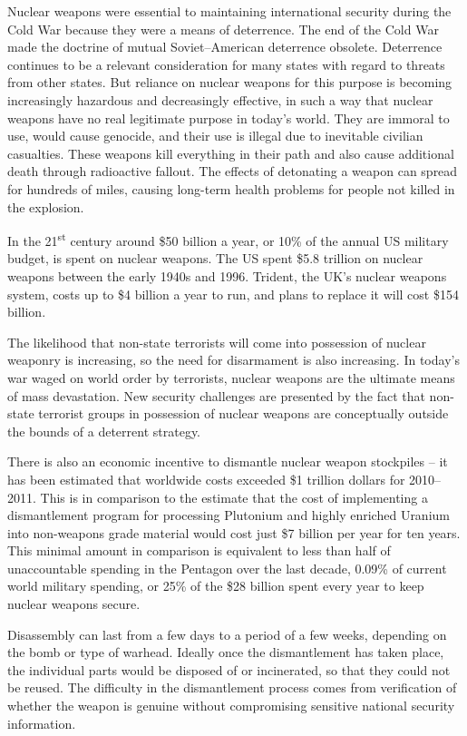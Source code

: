 \documentclass[twoside,titlepage,11pt,twocolumn,a4paper]{article}
\begin{document}
Nuclear weapons were essential to maintaining international security
during the Cold War because they were a means of deterrence. The end
of the Cold War made the doctrine of mutual Soviet--American
deterrence obsolete. Deterrence continues to be a relevant
consideration for many states with regard to threats from other
states. But reliance on nuclear weapons for this purpose is becoming
increasingly hazardous and decreasingly effective, in such a way that
nuclear weapons have no real legitimate purpose in today’s world. They
are immoral to use, would cause genocide, and their use is illegal due
to inevitable civilian casualties. These weapons kill everything in
their path and also cause additional death through radioactive
fallout. The effects of detonating a weapon can spread for hundreds of
miles, causing long-term health problems for people not killed in the
explosion.

In the 21\textsuperscript{st} century around \$50 billion a year, or
10\% of the annual US military budget, is spent on nuclear
weapons. \citep{USspending} The US spent \$5.8 trillion on nuclear
weapons between the early 1940s and 1996. Trident, the UK's nuclear
weapons system, costs up to \$4 billion a year to run, and plans to
replace it will cost \$154 billion.

The likelihood that non-state terrorists will come into possession of
nuclear weaponry is increasing, so the need for disarmament is also
increasing. In today's war waged on world order by terrorists, nuclear
weapons are the ultimate means of mass devastation. New security
challenges are presented by the fact that non-state terrorist groups
in possession of nuclear weapons are conceptually outside the bounds
of a deterrent strategy.

There is also an economic incentive to dismantle nuclear weapon
stockpiles -- it has been estimated that worldwide costs exceeded \$1
trillion dollars for 2010--2011. \citep{worldSpending} This is in
comparison to the estimate that the cost of implementing a
dismantlement program for processing Plutonium and highly enriched
Uranium into non-weapons grade material would cost just \$7 billion
per year for ten years. \citep{worldSafe} This minimal amount in
comparison is equivalent to less than half of unaccountable spending
in the Pentagon over the last decade, 0.09\% of current world military
spending, or 25\% of the \$28 billion spent every year to keep nuclear
weapons secure.

Disassembly can last from a few days to a period of a few weeks,
depending on the bomb or type of warhead. \citep{kopte1996} Ideally
once the dismantlement has taken place, the individual parts would be
disposed of or incinerated, so that they could not be reused. The
difficulty in the dismantlement process comes from verification of
whether the weapon is genuine without compromising sensitive national
security information.
\end{document}
